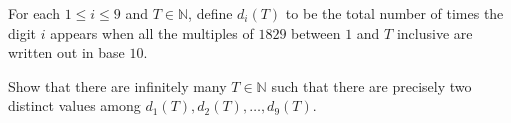 For each $1 \leq i \leq 9$ and $T \in \mathbb{N}$, define $d_i(T)$ to be the total number of times the digit $i$ appears when all the multiples of $1829$ between $1$ and $T$ inclusive are written out in base $10$.

Show that there are infinitely many $T \in \mathbb{N}$ such that there are precisely two distinct values among $d_1(T), d_2(T), \ldots, d_9(T)$.
